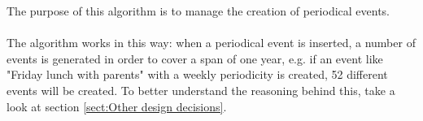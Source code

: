 The purpose of this algorithm is to manage the creation of periodical events. \\ \\
The algorithm works in this way: when a periodical event is inserted, a number of events is generated in order to cover a span of one year, e.g. if an event like "Friday lunch with parents" with a weekly periodicity is created, 52 different events will be created.
To better understand the reasoning behind this, take a look at section \ref{sect:Other design decisions}.